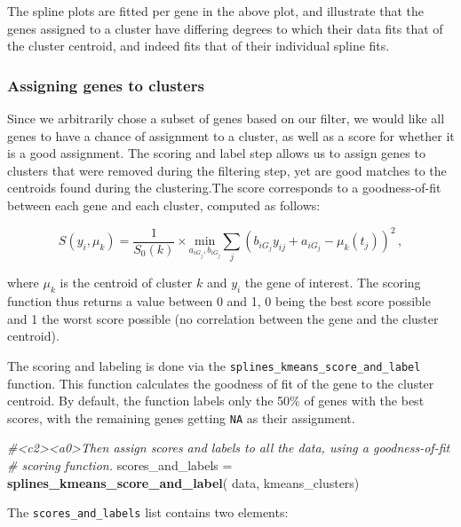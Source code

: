 \documentclass[9pt,a4paper,]{extarticle}
\newenvironment{Shaded}{\begin{snugshade}}{\end{snugshade}}
\newcommand{\CommentTok}[1]{\textcolor[rgb]{0.56,0.35,0.01}{\textit{#1}}}
\newcommand{\KeywordTok}[1]{\textcolor[rgb]{0.13,0.29,0.53}{\textbf{#1}}}
\newcommand{\NormalTok}[1]{#1}
\newcommand{\StringTok}[1]{\textcolor[rgb]{0.31,0.60,0.02}{#1}}
\begin{document}
The spline plots are fitted per gene in the above plot, and illustrate that
the genes assigned to a cluster have differing degrees to which their data
fits that of the cluster centroid, and indeed fits that of their individual
spline fits.

\hypertarget{assigning-genes-to-clusters}{%
\subsubsection{Assigning genes to clusters}\label{assigning-genes-to-clusters}}

Since we arbitrarily chose a subset of genes based on our filter, we would
like all genes to have a chance of assignment to a cluster, as well as a score
for whether it is a good assignment. The scoring and label step allows us to
assign genes to clusters that were removed during the filtering step, yet are
good matches to the centroids found during the clustering.The score
corresponds to a goodness-of-fit between each gene and each cluster, computed
as follows:

\[
S(y_i, \mu_k) =  \frac{1}{S_0(k)} \times \underset{a_{iG_j}, b_{iG_j}}{\text{min}}\sum_{j}
  {\left(b_{iG_j}y_{ij} + a_{iG_j}
   - \mu_k(t_j)\right)}^2 \,,
\]

where \(\mu_k\) is the centroid of cluster \(k\) and \(y_i\) the gene of interest.
The scoring function thus returns a value between 0 and 1, 0 being the best
score possible and 1 the worst score possible (no correlation between the gene
and the cluster centroid).

The scoring and labeling is done via the \texttt{splines\_kmeans\_score\_and\_label}
function. This function calculates the goodness of fit of the gene to the
cluster centroid. By default, the function labels only the 50\% of genes with
the best scores, with the remaining genes getting \texttt{NA} as their assignment.

\begin{Shaded}
\begin{Highlighting}[]
\CommentTok{#<c2><a0>Then assign scores and labels to all the data, using a goodness-of-fit}
\CommentTok{# scoring function.}
\NormalTok{scores_and_labels =}\StringTok{ }\KeywordTok{splines_kmeans_score_and_label}\NormalTok{(}
\NormalTok{    data, kmeans_clusters)}
\end{Highlighting}
\end{Shaded}

The \texttt{scores\_and\_labels} list contains two elements:
\end{document}
